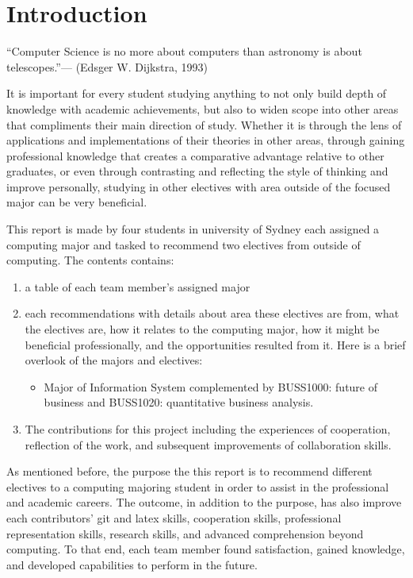\documentclass{article}
\begin{document}
\section{Introduction}
	\begin{displayquote}
	“Computer Science is no more about computers than astronomy is about telescopes.”— (Edsger W. Dijkstra, 1993)
	\end{displayquote}
	It is important for every student studying anything to not only build depth of knowledge with academic achievements, but also to widen scope into other areas that compliments their main direction of study. Whether it is through the 	lens of applications and implementations of their theories in other areas, through gaining professional knowledge that creates a comparative advantage relative to other graduates, or even through contrasting and reflecting the style of thinking and improve personally, studying in other electives with area outside of the focused major can be very beneficial.\par
	This report is made by four students in university of Sydney each assigned a computing major and tasked to recommend two electives from outside of computing. The contents contains:
	\begin{enumerate}
		\item a table of each team member’s assigned major
		\item each recommendations with details about area these electives are from, what the electives are, how it relates to the computing major, how it might be beneficial professionally, and the opportunities resulted from it. Here is a brief overlook of the majors and electives:
		\begin{itemize}
			\item Major of Information System complemented by BUSS1000: future of business and BUSS1020: quantitative business analysis.
		\end{itemize}
		\item The contributions for this project including the experiences of cooperation, reflection of the work, and subsequent improvements of collaboration skills.
	\end{enumerate}
	As mentioned before, the purpose the this report is to recommend different electives to a computing majoring student in order to assist in the professional and academic careers. The outcome, in addition to the purpose, has also improve each contributors’ git and latex skills, cooperation skills, professional representation skills, research skills, and  advanced comprehension beyond computing. To that end, each team member found satisfaction, gained knowledge, and developed capabilities to perform in the future.
\end{document}
